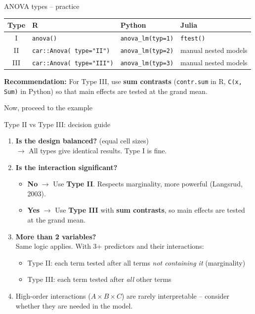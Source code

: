 \documentclass[10pt,ignorenonframetext,aspectratio=169]{beamer}
\begin{document}
\begin{frame}{ANOVA types -- practice}

    \begin{table}[h]\centering\small
        \begin{tabular}{cp{3cm}p{3cm}p{2.5cm}}
        \hline
          \textbf{Type}   & \textbf{R} &  \textbf{Python} & \textbf{Julia} \\
        \hline
         I  & \texttt{anova()} & \texttt{anova\_lm(typ=1)} & \texttt{ftest()} \\
         II & \texttt{car::Anova( type="II")} & \texttt{anova\_lm(typ=2)} & manual nested models \\
         III & \texttt{car::Anova( type="III")} & \texttt{anova\_lm(typ=3)} & manual nested models \\
        \hline
        \end{tabular}
    \end{table}

    \medskip
    \textbf{Recommendation:} For Type III, use \textbf{sum contrasts} (\texttt{contr.sum} in R, \texttt{C(x, Sum)} in Python) so that main effects are tested at the grand mean.

    \medskip
    \begin{center}
    Now, proceed to the example
    \end{center}
\end{frame}

\begin{frame}{Type II vs Type III: decision guide}
    \begin{enumerate}
        \item \textbf{Is the design balanced?} (equal cell sizes)\\
              $\rightarrow$ All types give identical results. Type I is fine.
        \item \textbf{Is the interaction significant?}
        \begin{itemize}
            \item \textbf{No} $\rightarrow$ Use \textbf{Type II}. Respects marginality, more powerful (Langsrud, 2003).
            \item \textbf{Yes} $\rightarrow$ Use \textbf{Type III} with \textbf{sum contrasts}, so main effects are tested at the grand mean.
        \end{itemize}
        \item \textbf{More than 2 variables?}\\
              Same logic applies. With 3+ predictors and their interactions:
              \begin{itemize}
                  \item Type II: each term tested after all terms \emph{not containing it} (marginality)
                  \item Type III: each term tested after \emph{all} other terms
              \end{itemize}
        \item \alert{High-order interactions} ($A \times B \times C$) are rarely interpretable -- consider whether they are needed in the model.
    \end{enumerate}
\end{frame}
\end{document}
